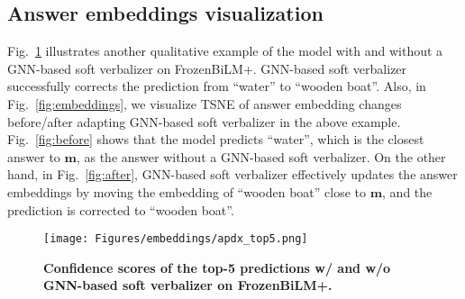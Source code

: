 \documentclass[10pt,twocolumn,letterpaper]{article}
\begin{document}
\subsection{Answer embeddings visualization}
Fig.~\ref{fig:apdx_top5} illustrates another qualitative example of the model with and without a GNN-based soft verbalizer on FrozenBiLM+.
GNN-based soft verbalizer successfully corrects the prediction from ``water'' to ``wooden boat''.
Also, in Fig.~\ref{fig:embeddings}, we visualize TSNE of answer embedding changes before/after adapting GNN-based soft verbalizer in the above example.
Fig.~\ref{fig:before} shows that the model predicts ``water'', which is the closest answer to $\mathbf{m}$, as the answer without a GNN-based soft verbalizer.
On the other hand, in Fig.~\ref{fig:after}, GNN-based soft verbalizer effectively updates the answer embeddings by moving the embedding of ``wooden boat'' close to $\mathbf{m}$, and the prediction is corrected to ``wooden boat''. \begin{figure}[t] 
    \centering
        \texttt{[image: Figures/embeddings/apdx\_top5.png]}
        \caption{\textbf{Confidence scores of the top-5 predictions w/ and w/o GNN-based soft verbalizer on FrozenBiLM+.}}
        \label{fig:apdx_top5}
\end{figure}
\end{document}
